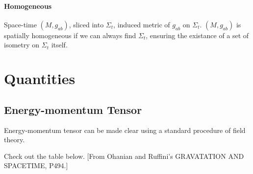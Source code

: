 \documentclass[11pt]{book}
\begin{document}
\paragraph{Homogeneous} 
Space-time $(M,g_{ab})$, sliced into ${\Sigma_t}$, induced metric of $g_{ab}$ on $\Sigma_t$. $(M, g_{ab})$ is spatially homogeneous if we can always find ${\Sigma_t}$, ensuring the existance of a set of isometry on $\Sigma_t$ itself.








































\section{Quantities}

\subsection{Energy-momentum Tensor}

Energy-momentum tensor can be made clear using a standard procedure of field theory.

Check out the table below. [From Ohanian and Ruffini's GRAVATATION AND SPACETIME, P494.]
\end{document}
